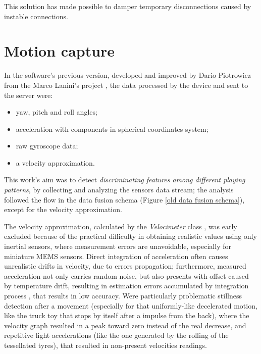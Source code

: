 This solution has made possible to damper temporary disconnections caused by instable connections.

\section{Motion capture}
In the software's previous version, developed and improved by Dario Piotrowicz \cite{Pio19} from the Marco Lanini's project \cite{Lan17}, the data processed by the device and sent to the server were:
\begin{itemize}
	\item yaw, pitch and roll angles;
	\item acceleration with components in spherical coordinates system;
	\item raw gyroscope data;
	\item a velocity approximation.
\end{itemize}

This work's aim was to detect \textit{discriminating features among different playing patterns}, by collecting and analyzing the sensors data stream; the analysis followed the flow in the data fusion schema (Figure \ref{old data fusion schema}), except for the velocity approximation.
\bigbreak

The velocity approximation, calculated by the \textit{Velocimeter} class \cite{Pio19}, was early excluded because of the practical difficulty in obtaining realistic values using only inertial sensors, where measurement errors are unavoidable, especially for miniature MEMS sensors. Direct integration of acceleration often causes unrealistic drifts in velocity, due to errors propagation; furthermore, measured acceleration not only carries random noise, but also presents with offset caused by temperature drift, resulting in estimation errors accumulated by integration process \cite{Du15, Est14, Kow15, Liu01, Sei07, UsingAcc, Woo07, Yan06}, that results in low accuracy. Were particularly problematic stillness detection after a movement (especially for that uniformly-like decelerated motion, like the truck toy that stops by itself after a impulse from the back), where the velocity graph resulted in a peak toward zero instead of the real decrease, and repetitive light accelerations (like the one generated by the rolling of the tessellated tyres), that resulted in non-present velocities readings.


